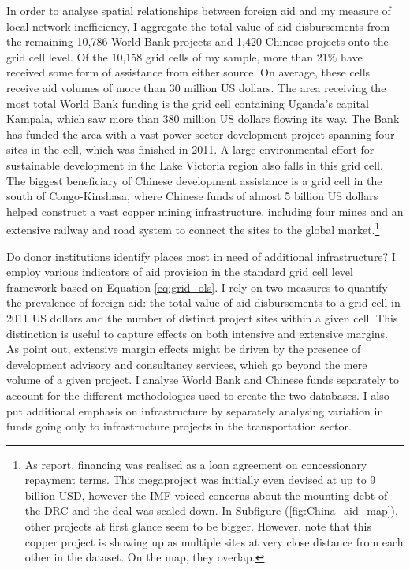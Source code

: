 \documentclass[11pt, oneside]{article}   	%
\let\oldref\ref
\renewcommand{\ref}[1]{(\oldref{#1})}
\begin{document}
In order to analyse spatial relationships between foreign aid and my measure of local network inefficiency, I aggregate the total value of aid disbursements from the remaining 10,786 World Bank projects and 1,420 Chinese projects onto the grid cell level. Of the 10,158 grid cells of my sample, more than 21\% have received some form of assistance from either source. On average, these cells receive aid volumes of more than 30 million US dollars. The area receiving the most total World Bank funding is the grid cell containing Uganda's capital Kampala, which saw more than 380 million US dollars flowing its way. The Bank has funded the area with a vast power sector development project spanning four sites in the cell, which was finished in 2011. A large environmental effort for sustainable development in the Lake Victoria region also falls in this grid cell. The biggest beneficiary of Chinese development assistance is a grid cell in the south of Congo-Kinshasa, where Chinese funds of almost 5 billion US dollars helped construct a vast copper mining infrastructure, including four mines and an extensive railway and road system to connect the sites to the global market.\footnote{As \cite{Strange_TrackingUnderreportedFinancial_2017} report, financing was realised as a loan agreement on concessionary repayment terms. This megaproject was initially even devised at up to 9 billion USD, however the IMF voiced concerns about the mounting debt of the DRC and the deal was scaled down. In Subfigure \ref{fig:China_aid_map}, other projects at first glance seem to be bigger. However, note that this copper project is showing up as multiple sites at very close distance from each other in the dataset. On the map, they overlap.}

Do donor institutions identify places most in need of additional infrastructure? I employ various indicators of aid provision in the standard grid cell level framework based on Equation \eqref{eq:grid_ols}. I rely on two measures to quantify the prevalence of foreign aid: the total value of aid disbursements to a grid cell in 2011 US dollars and the number of distinct project sites within a given cell. This distinction is useful to capture effects on both intensive and extensive margins. As \cite{Dreher_Aidgrowthregional_2015} point out, extensive margin effects might be driven by the presence of development advisory and consultancy services, which go beyond the mere volume of a given project. I analyse World Bank and Chinese funds separately to account for the different methodologies used to create the two databases. I also put additional emphasis on infrastructure by separately analysing variation in funds going only to infrastructure projects in the transportation sector.
\end{document}

